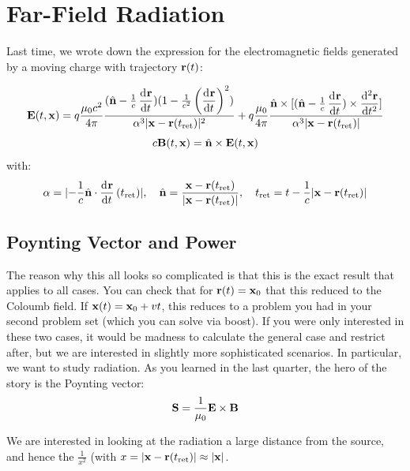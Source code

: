 \section{Far-Field Radiation}
Last time, we wrote down the expression for the electromagnetic fields generated by a moving charge with trajectory $\mathbf{r}(t)$:

\begin{equation}
    \v{E}(t, \v{x}) = q\frac{\mu_0 c^2}{4\pi}\frac{(\hat{\v{n}} - \frac{1}{c}\dod{\v{r}}{t})(1 - \frac{1}{c^2}\left(\dod{\v{r}}{t}\right)^2)}{\alpha^3\abs{\v{x} - \v{r}(t_{\text{ret}})}^2} + q\frac{\mu_0}{4\pi}\frac{\hat{\v{n}} \times [(\hat{\v{n}} - \frac{1}{c}\dod{\v{r}}{t})\times \dod[2]{\v{r}}{t}]}{\alpha^3\abs{\v{x} - \v{r}(t_{\text{ret}})}}
\end{equation}
\begin{equation}
    c\mathbf{B}(t, \mathbf{x}) = \hat{\mathbf{n}} \times \mathbf{E}(t, \mathbf{x})
\end{equation}
with:
\begin{equation}
    \alpha = \abs{-\frac{1}{c}\hat{\v{n}}\cdot\dod{\v{r}}{t}(t_{\text{ret}})}, \quad \hat{\v{n}} = \frac{\v{x} - \v{r}(t_{\text{ret}})}{\abs{\v{x} - \v{r}(t_{\text{ret}})}}, \quad t_{\text{ret}} = t - \frac{1}{c}\abs{\v{x} - \v{r}(t_{\text{ret}})}
\end{equation}

\subsection{Poynting Vector and Power}
The reason why this all looks so complicated is that this is the exact result that applies to all cases. You can check that for $\mathbf{r}(t) = \mathbf{x}_0$ that this reduced to the Coloumb field. If $\mathbf{x}(t) = \mathbf{x}_0 + vt$, this reduces to a problem you had in your second problem set (which you can solve via boost). If you were only interested in these two cases, it would be madness to calculate the general case and restrict after, but we are interested in slightly more sophisticated scenarios. In particular, we want to study radiation. As you learned in the last quarter, the hero of the story is the Poynting vector:
\begin{equation}
    \mathbf{S} = \frac{1}{\mu_0}\mathbf{E} \times \mathbf{B}
\end{equation}

We are interested in looking at the radiation a large distance from the source, and hence the $\frac{1}{x^2}$ (with $x = \lvert \mathbf{x} - \mathbf{r}(t_{\text{ret}}) \rvert \approx \lvert \mathbf{x} \rvert$.

